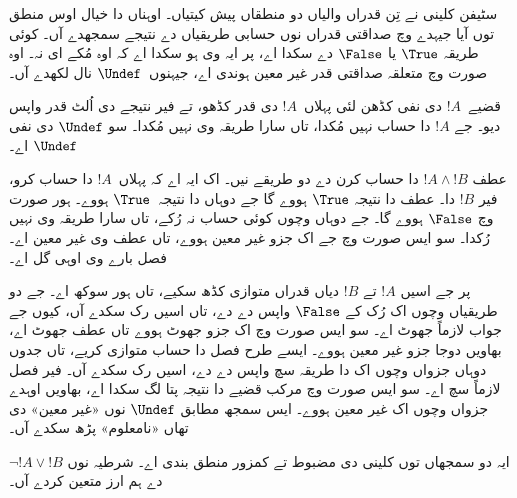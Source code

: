 \documentclass[../../../include/open-logic-section]{subfiles}
\begin{document}


سٹیفن کلینی نے تِن قدراں والیاں دو منطقاں پیش کیتیاں۔ اوہناں
دا خیال اوس منطق توں آیا جیہدے وچ صداقتی قدراں نوں حسابی
طریقیاں دے نتیجے سمجھدے آں۔ کوئی طریقہ $\True$ یا $\False$
دے سکدا اے، پر ایہ وی ہو سکدا اے کہ اوہ مُکے ای نہ۔ اوہ
صورت وچ متعلقہ صداقتی قدر غیر معین ہوندی اے، جیہنوں~$\Undef$
نال لکھدے آں۔

قضیے~$!A$ دی نفی کڈھن لئی پہلاں~$!A$ دی قدر کڈھو، تے
فیر نتیجے دی اُلٹ قدر واپس دیو۔ جے $!A$ دا حساب نہیں مُکدا،
تاں سارا طریقہ وی نہیں مُکدا۔ سو $\Undef$ دی نفی $\Undef$ اے۔

عطف $!A \land !B$ دا حساب کرن دے دو طریقے نیں۔ اک ایہ اے
کہ پہلاں~$!A$ دا حساب کرو، فیر $!B$ دا۔ عطف دا نتیجہ $\True$
ہووے گا جے دوہاں دا نتیجہ~$\True$ ہووے۔ ہور صورت وچ $\False$
ہووے گا۔ جے دوہاں وچوں کوئی حساب نہ رُکے، تاں سارا طریقہ وی
نہیں رُکدا۔ سو ایس صورت وچ جے اک جزو غیر معین ہووے، تاں عطف
وی غیر معین اے۔ فصل بارے وی اوہی گل اے۔

پر جے اسیں $!A$ تے $!B$ دیاں قدراں متوازی کڈھ سکیے، تاں
ہور سوکھ اے۔ جے دو طریقیاں وچوں اک رُک کے $\False$ واپس
دے دے، تاں اسیں رک سکدے آں، کیوں جے جواب لازماً جھوٹ اے۔
سو ایس صورت وچ اک جزو جھوٹ ہووے تاں عطف جھوٹ اے، بھاویں
دوجا جزو غیر معین ہووے۔ ایسے طرح فصل دا حساب متوازی کریے،
تاں جدوں دوہاں جزواں وچوں اک دا طریقہ سچ واپس دے دے، اسیں
رک سکدے آں۔ فیر فصل لازماً سچ اے۔ سو ایس صورت وچ مرکب
قضیے دا نتیجہ پتا لگ سکدا اے، بھاویں اوہدے جزواں وچوں اک
غیر معین ہووے۔ ایس سمجھ مطابق $\Undef$ نوں «غیر معین» دی
تھاں «نامعلوم» پڑھ سکدے آں۔

ایہ دو سمجھاں توں کلینی دی مضبوط تے کمزور منطق بندی اے۔
شرطیہ نوں $\lnot !A \lor !B$ دے ہم ارز متعین کردے آں۔
\end{document}
